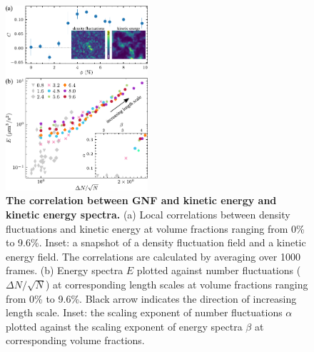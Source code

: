 \documentclass[twocolumn,aps,prl,amsmath,amssymb,longbibliography]{revtex4-2}
\begin{document}
\begin{figure}[!]
\begin{center}
\includegraphics[width=0.47\textwidth]{figures/GNF-energy-spectra-correlation/v1.pdf}
\caption[The correlation between GNF and kinetic energy and kinetic energy spectra.]
{
\textbf{The correlation between GNF and kinetic energy and kinetic energy spectra.}
(a) Local correlations between density fluctuations and kinetic energy at volume fractions ranging from 0\% to 9.6\%. Inset: a snapshot of a density fluctuation field and a kinetic energy field. The correlations are calculated by averaging over 1000 frames.
(b) Energy spectra $E$ plotted against number fluctuations ($\Delta N/\sqrt N$) at corresponding length scales at volume fractions ranging from 0\% to 9.6\%. Black arrow indicates the direction of increasing length scale. Inset: the scaling exponent of number fluctuations $\alpha$ plotted against the scaling exponent of energy spectra $\beta$ at corresponding volume fractions.
}
\label{fig:GNF-energy-spectra-correlation}
\end{center}
\end{figure}
\end{document}
